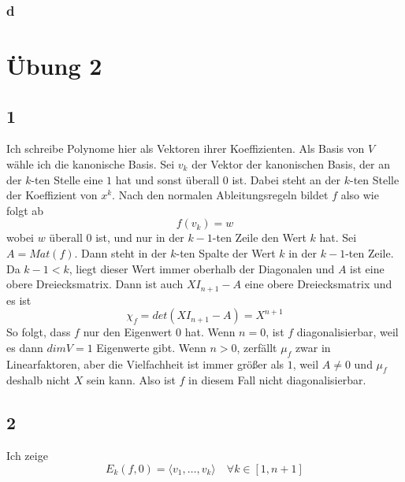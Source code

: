 \documentclass[10pt,a4paper]{article}
\begin{document}
\subsubsection*{d}

\section*{Übung 2}

\subsection*{1}

Ich schreibe Polynome hier als Vektoren ihrer Koeffizienten.
Als Basis von $V$ wähle ich die kanonische Basis.
Sei $v_{k}$ der Vektor der kanonischen Basis, der an der $k$-ten Stelle eine $1$ hat und sonst überall $0$ ist.
Dabei steht an der $k$-ten Stelle der Koeffizient von $x^{k}$.
Nach den normalen Ableitungsregeln bildet $f$ also wie folgt ab
\begin{equation}
f(v_{k}) = w
\end{equation}
wobei $w$ überall $0$ ist, und nur in der $k - 1$-ten Zeile den Wert $k$ hat.
Sei $A = Mat(f)$.
Dann steht in der $k$-ten Spalte der Wert $k$ in der $k - 1$-ten Zeile.
Da $k - 1 < k$, liegt dieser Wert immer oberhalb der Diagonalen und $A$ ist eine obere Dreiecksmatrix.
Dann ist auch $XI_{n + 1} - A$ eine obere Dreiecksmatrix und es ist
\begin{equation}
\chi_{f} = det(XI_{n + 1} - A) = X^{n + 1}
\end{equation}
So folgt, dass $f$ nur den Eigenwert $0$ hat.
Wenn $n = 0$, ist $f$ diagonalisierbar, weil es dann $dim V = 1$ Eigenwerte gibt.
Wenn $n > 0$, zerfällt $\mu_{f}$ zwar in Linearfaktoren, aber die Vielfachheit ist immer größer als $1$, weil $A \ne 0$ und $\mu_{f}$ deshalb nicht $X$ sein kann.
Also ist $f$ in diesem Fall nicht diagonalisierbar.

\subsection*{2}

Ich zeige
\begin{equation}
E_{k}(f, 0) = \langle v_{1}, \dots, v_{k} \rangle \quad \forall k \in [1, n + 1]
\end{equation}
\end{document}
